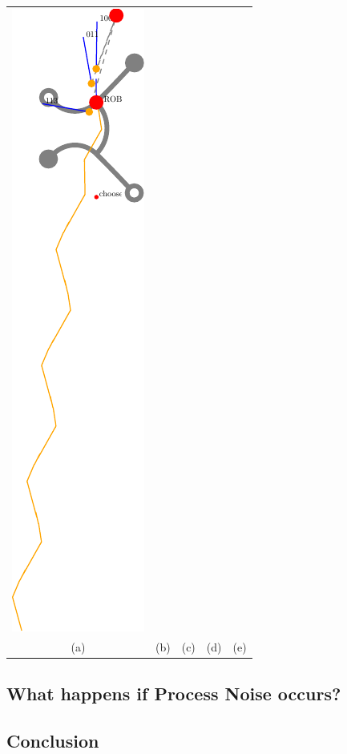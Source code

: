 \documentclass[10pt,a4paper]{article}
\begin{document}
\begin{tabular}{ccccc}
\includegraphics[scale=.8]{pics/pathplanner_without_noise/example_straight/dec_80.pdf}
\\
(a) & (b) & (c) & (d) & (e) 
\\
\end{tabular}



\subsection{What happens if Process Noise occurs?}



\subsection{Conclusion}
\end{document}
